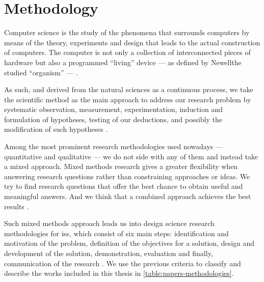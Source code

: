 \documentclass[showtrims, oldfontcommands]{kthesis}
\begin{document}
\section{Methodology}
    \label{section:thesis:methodology}
Computer science is the study of the phenomena that surrounds computers by means 
of the theory, experiments and design that leads to the actual construction of computers. 
The computer is not only a collection of interconnected pieces of hardware but also 
a programmed ``living'' device --- as defined by Newell\etal the studied ``organism'' 
--- \cite{NewellS76}.

As such, and derived from the natural sciences as a continuous process, we take 
the scientific method as the main approach to address our research problem by systematic 
observation, measurement, experimentation, induction and formulation of hypotheses, 
testing of our deductions, and possibly the modification of such hypotheses \cite{Oxford14}.

Among the most prominent research methodologies used nowadays --- quantitative and 
qualitative --- we do not side with any of them and instead take a mixed approach. 
Mixed methods research gives a greater flexibility when answering research questions 
rather than constraining approaches or ideas. We try to find research questions 
that offer the best chance to obtain useful and meaningful answers. And we think 
that a combined approach achieves the best results \cite{JohnsonO04}.

Such mixed methods approach leads us into design science research methodologies 
for \acp{is}, which consist of six main steps: identification and motivation of the 
problem, definition of the objectives for a solution, design and development of 
the solution, demonstration, evaluation and finally, communication of the research 
\cite{PeffersTRC07}. We use the previous criteria to classify and describe the works 
included in this thesis in \cref{table:papers-methodologies}.
\end{document}
